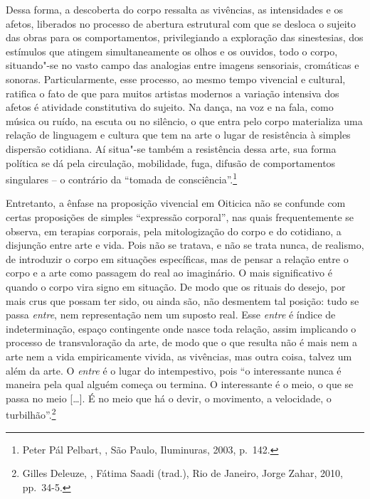 Dessa forma, a descoberta do corpo ressalta as vivências, as
intensidades e os afetos, liberados no processo de abertura estrutural
com que se desloca o sujeito das obras para os comportamentos,
privilegiando a exploração das sinestesias, dos estímulos que atingem
simultaneamente os olhos e os ouvidos, todo o corpo, situando"-se no
vasto campo das analogias entre imagens sensoriais, cromáticas e
sonoras. Particularmente, esse processo, ao mesmo tempo vivencial e
cultural, ratifica o fato de que para muitos artistas modernos a
variação intensiva dos afetos é atividade constitutiva do sujeito. Na
dança, na voz e na fala, como música ou ruído, na escuta ou no silêncio,
o que entra pelo corpo materializa uma relação de linguagem e cultura
que tem na arte o lugar de resistência à simples dispersão cotidiana. Aí
situa"-se também a resistência dessa arte, sua forma política se dá pela
circulação, mobilidade, fuga, difusão de comportamentos singulares -- o
contrário da ``tomada de consciência''.\footnote{Peter Pál Pelbart, {}, São Paulo, Iluminuras, 2003, p.~142.}

Entretanto, a ênfase na proposição vivencial em Oiticica não se confunde
com certas proposições de simples ``expressão corporal'', nas quais
frequentemente se observa, em terapias corporais, pela mitologização do
corpo e do cotidiano, a disjunção entre arte e vida. Pois não se
tratava, e não se trata nunca, de realismo, de introduzir o corpo em
situações específicas, mas de pensar a relação entre o corpo e a arte
como passagem do real ao imaginário. O mais significativo é quando o
corpo vira signo em situação. De modo que os rituais do desejo, por mais
crus que possam ter sido, ou ainda são, não desmentem tal posição: tudo
se passa \emph{entre}, nem representação nem um suposto real.
Esse \emph{entre} é índice de indeterminação, espaço contingente onde
nasce toda relação, assim implicando o processo de transvaloração da
arte, de modo que o que resulta não é mais nem a arte nem a vida
empiricamente vivida, as vivências, mas outra coisa, talvez um além da
arte. O \emph{entre} é o lugar do intempestivo, pois ``o interessante
nunca é maneira pela qual alguém começa ou termina. O interessante é o
meio, o que se passa no meio {[}\ldots{}{]}. É no meio que há o devir, o
movimento, a velocidade, o turbilhão''.\footnote{Gilles Deleuze, {}, Fátima Saadi (trad.), Rio de Janeiro,
  Jorge Zahar, 2010, pp.~34-5.}

\pagebreak

